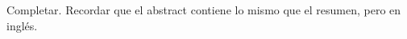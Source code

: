 \begin{Abstract}

Completar. Recordar que el abstract contiene lo mismo que el resumen, pero en inglés.

\end{Abstract}